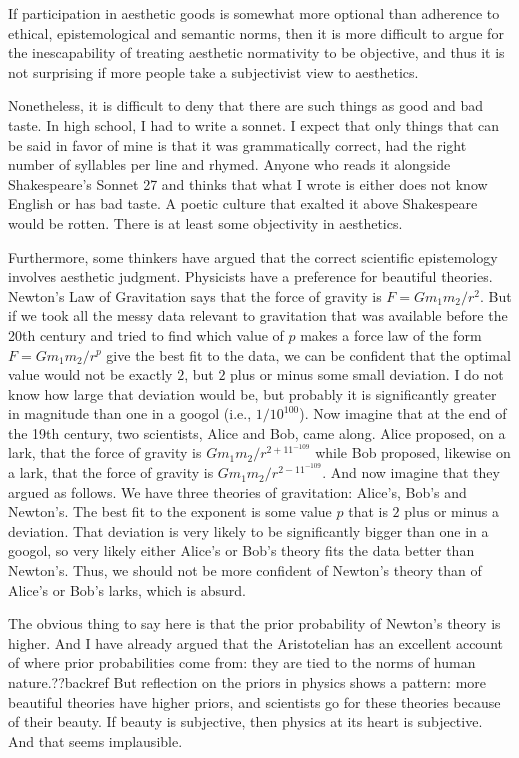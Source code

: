 If participation in aesthetic goods is somewhat more optional than adherence to ethical, epistemological
and semantic norms, then it is more difficult to argue for the inescapability of treating aesthetic normativity
to be objective, and thus it is not surprising if more people take a subjectivist view to aesthetics.

Nonetheless, it is difficult to deny that there are such things as good and bad taste. In high school, I had
to write a sonnet. I expect that only things that can be said in favor of mine is that it was grammatically
correct, had the right number of syllables per line and rhymed. Anyone who reads it alongside Shakespeare's 
Sonnet 27 and thinks that what I wrote is either does not know English or has bad taste. A poetic culture 
that exalted it above Shakespeare would be rotten.  There is at least some objectivity in aesthetics.

Furthermore, some thinkers have argued that the correct scientific epistemology involves aesthetic judgment. 
Physicists have a preference for beautiful theories. Newton's Law of Gravitation says that the force of gravity
is $F=Gm_1m_2/r^2$. But if we took all the messy data relevant to gravitation that was available before the 20th century
and tried to find which value of $p$ makes a force law of the form $F=Gm_1m_2/r^p$ give the best fit to the data,
we can be confident that the optimal value would not be exactly $2$, but $2$ plus or minus some small deviation.
I do not know how large that deviation would be, but probably it is significantly greater in magnitude than one 
in a googol (i.e., $1/10^{100}$). Now imagine that at the end of the 19th century, two scientists, Alice and Bob, 
came along. Alice proposed, on a lark, that the force of gravity is $Gm_1m_2/r^{2+11^{-109}}$ while Bob proposed,
likewise on a lark, that the force 
of gravity is $Gm_1m_2/r^{2-11^{-109}}$. And now imagine that they argued as follows. We have three theories of
gravitation: Alice's, Bob's and Newton's. The best fit to the exponent is some value $p$ that is $2$ plus or minus
a deviation. That deviation is very likely to be significantly bigger than one in a googol, so very likely either
Alice's or Bob's theory fits the data better than Newton's. Thus, we should not be more confident of Newton's
theory than of Alice's or Bob's larks, which is absurd.

The obvious thing to say here is that the prior probability of Newton's theory is higher. And I have already
argued that the Aristotelian has an excellent account of where prior probabilities come from: they are tied
to the norms of human nature.??backref But reflection on the priors in physics shows a pattern: more
beautiful theories have higher priors, and scientists go for these theories because of their beauty. If
beauty is subjective, then physics at its heart is subjective. And that seems implausible. 

